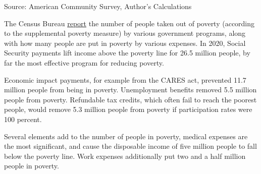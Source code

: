 \documentclass{report}
\begin{document}
{\vspace{-5mm}
\footnotesize{Source: American Community Survey, Author's Calculations}

\newpage
\begin{minipage}{0.76\textwidth}
\small The Census Bureau \href{https://www.census.gov/library/publications/2021/demo/p60-275.html}{report} the number of people taken out of poverty (according to the supplemental poverty measure) by various government programs, along with how many people are put in poverty by various expenses. In 2020, Social Security payments lift income above the poverty line for 26.5 million people, by far the most effective program for reducing poverty.

Economic impact payments, for example from the CARES act, prevented 11.7 million people from being in poverty. Unemployment benefits removed 5.5 million people from poverty. Refundable tax credits, which often fail to reach the poorest people, would remove 5.3 million people from poverty if participation rates were 100 percent. 

Several elements add to the number of people in poverty, medical expenses are the most significant, and cause the disposable income of five million people to fall below the poverty line. Work expenses additionally put two and a half million people in poverty.

\vspace{5mm}


\end{minipage}}
\end{document}
